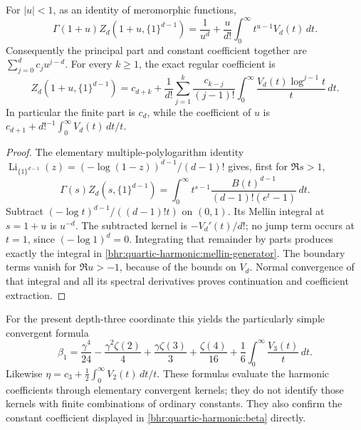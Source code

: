 \begin{lemma}
\label{bhr:quartic-harmonic:mellin}
For $|u|<1$, as an identity of meromorphic functions,
\begin{equation}
 \Gamma(1+u)Z_d(1+u,\{1\}^{d-1})
   =\frac1{u^d}+\frac{u}{d!}
       \int_0^\infty t^{u-1}V_d(t)\,dt.
 \label{bhr:quartic-harmonic:mellin-generator}
\end{equation}
Consequently the principal part and constant coefficient together are
$\sum_{j=0}^{d}c_j u^{j-d}$. For every $k\ge1$, the exact regular
coefficient is
\begin{equation}
 [u^k]Z_d(1+u,\{1\}^{d-1})
  =c_{d+k}+\frac1{d!}\sum_{j=1}^k
       \frac{c_{k-j}}{(j-1)!}
       \int_0^\infty\frac{V_d(t)\log^{j-1}t}{t}\,dt.
 \label{bhr:quartic-harmonic:mellin-coefficients}
\end{equation}
In particular the finite part is $c_d$, while the coefficient of $u$
is $c_{d+1}+d!^{-1}\int_0^\infty V_d(t)\,dt/t$.
\end{lemma}

\begin{proof}
The elementary multiple-polylogarithm identity
$\operatorname{Li}_{\{1\}^{d-1}}(z)
=(-\log(1-z))^{d-1}/(d-1)!$ gives, first for $\Re s>1$,
\[
 \Gamma(s)Z_d(s,\{1\}^{d-1})
  =\int_0^\infty t^{s-1}
       \frac{B(t)^{d-1}}{(d-1)!(e^t-1)}\,dt.
\]
Subtract $(-\log t)^{d-1}/((d-1)!t)$ on $(0,1)$.
Its Mellin integral at $s=1+u$ is $u^{-d}$. The subtracted
kernel is $-V_d'(t)/d!$; no jump term occurs at $t=1$, since
$(-\log1)^d=0$. Integrating that remainder by parts produces
exactly the integral in \eqref{bhr:quartic-harmonic:mellin-generator}.
The boundary terms vanish for $\Re u>-1$, because of the bounds on
$V_d$. Normal convergence of that integral and all its spectral
derivatives proves continuation and coefficient extraction.
\end{proof}

For the present depth-three coordinate this yields the particularly
simple convergent formula
\begin{equation}
 \beta_1=
 \frac{\gamma^4}{24}-\frac{\gamma^2\zeta(2)}4
       +\frac{\gamma\zeta(3)}3+\frac{\zeta(4)}{16}
       +\frac16\int_0^\infty\frac{V_3(t)}t\,dt.
 \label{bhr:quartic-harmonic:beta-mellin}
\end{equation}
Likewise $\eta=c_3+\tfrac12\int_0^\infty V_2(t)\,dt/t$.
These formulas evaluate the harmonic coefficients through elementary
convergent kernels; they do not identify those kernels with finite
combinations of ordinary constants. They also confirm the constant
coefficient displayed in \eqref{bhr:quartic-harmonic:beta} directly.

